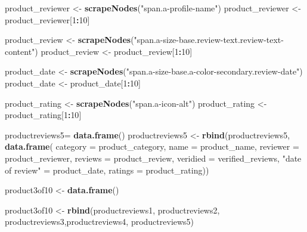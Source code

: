 \documentclass[
]{article}
\newenvironment{Shaded}{\begin{snugshade}}{\end{snugshade}}
\newcommand{\AttributeTok}[1]{\textcolor[rgb]{0.13,0.29,0.53}{#1}}
\newcommand{\DecValTok}[1]{\textcolor[rgb]{0.00,0.00,0.81}{#1}}
\newcommand{\FunctionTok}[1]{\textcolor[rgb]{0.13,0.29,0.53}{\textbf{#1}}}
\newcommand{\NormalTok}[1]{#1}
\newcommand{\OtherTok}[1]{\textcolor[rgb]{0.56,0.35,0.01}{#1}}
\newcommand{\SpecialCharTok}[1]{\textcolor[rgb]{0.81,0.36,0.00}{\textbf{#1}}}
\newcommand{\StringTok}[1]{\textcolor[rgb]{0.31,0.60,0.02}{#1}}
\begin{document}
\begin{Shaded}
\begin{Highlighting}[]
\NormalTok{  product\_reviewer }\OtherTok{\textless{}{-}} \FunctionTok{scrapeNodes}\NormalTok{(}\StringTok{"span.a{-}profile{-}name"}\NormalTok{)}
\NormalTok{  product\_reviewer }\OtherTok{\textless{}{-}}\NormalTok{ product\_reviewer[}\DecValTok{1}\SpecialCharTok{:}\DecValTok{10}\NormalTok{]}
  
\NormalTok{  product\_review }\OtherTok{\textless{}{-}} \FunctionTok{scrapeNodes}\NormalTok{(}\StringTok{"span.a{-}size{-}base.review{-}text.review{-}text{-}content"}\NormalTok{)}
\NormalTok{  product\_review }\OtherTok{\textless{}{-}}\NormalTok{ product\_review[}\DecValTok{1}\SpecialCharTok{:}\DecValTok{10}\NormalTok{]}
  
\NormalTok{  product\_date }\OtherTok{\textless{}{-}} \FunctionTok{scrapeNodes}\NormalTok{(}\StringTok{"span.a{-}size{-}base.a{-}color{-}secondary.review{-}date"}\NormalTok{)}
\NormalTok{  product\_date }\OtherTok{\textless{}{-}}\NormalTok{ product\_date[}\DecValTok{1}\SpecialCharTok{:}\DecValTok{10}\NormalTok{]}
  
\NormalTok{  product\_rating }\OtherTok{\textless{}{-}} \FunctionTok{scrapeNodes}\NormalTok{(}\StringTok{"span.a{-}icon{-}alt"}\NormalTok{)}
\NormalTok{  product\_rating }\OtherTok{\textless{}{-}}\NormalTok{ product\_rating[}\DecValTok{1}\SpecialCharTok{:}\DecValTok{10}\NormalTok{]}
  
\NormalTok{  productreviews5}\OtherTok{=} \FunctionTok{data.frame}\NormalTok{()}
\NormalTok{  productreviews5 }\OtherTok{\textless{}{-}} \FunctionTok{rbind}\NormalTok{(productreviews5, }\FunctionTok{data.frame}\NormalTok{(}
                      \AttributeTok{category =}\NormalTok{ product\_category,}
                      \AttributeTok{name =}\NormalTok{ product\_name,}
                      \AttributeTok{reviewer =}\NormalTok{ product\_reviewer,}
                      \AttributeTok{reviews =}\NormalTok{ product\_review,}
                      \AttributeTok{veridied =}\NormalTok{ verified\_reviews,}
                      \StringTok{"date of review"} \OtherTok{=}\NormalTok{ product\_date,}
                      \AttributeTok{ratings =}\NormalTok{ product\_rating))}
  
\NormalTok{  product3of10 }\OtherTok{\textless{}{-}} \FunctionTok{data.frame}\NormalTok{()}
  
\NormalTok{  product3of10 }\OtherTok{\textless{}{-}} \FunctionTok{rbind}\NormalTok{(productreviews1, productreviews2, productreviews3,productreviews4, productreviews5)}
\end{Highlighting}
\end{Shaded}
\end{document}

